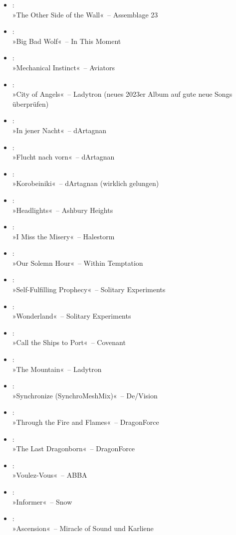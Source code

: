 \begin{itemize}
    \item :\\ »The Other Side of the Wall«~– Assemblage 23
    \item :\\ »Big Bad Wolf«~– In This Moment
    \item :\\ »Mechanical Instinct«~– Aviators
    \item :\\ »City of Angels«~– Ladytron (neues 2023er Album auf gute neue Songs überprüfen)
    \item :\\ »In jener Nacht«~– dArtagnan
    \item :\\ »Flucht nach vorn«~– dArtagnan
    \item :\\ »Korobeiniki«~– dArtagnan (wirklich gelungen)
    \item :\\ »Headlights«~– Ashbury Heights
    \item :\\ »I Miss the Misery«~– Halestorm
    \item :\\ »Our Solemn Hour«~– Within Temptation
    \item :\\ »Self-Fulfilling Prophecy«~– Solitary Experiments
    \item :\\ »Wonderland«~– Solitary Experiments
    \item :\\ »Call the Ships to Port«~– Covenant
    \item :\\ »The Mountain«~– Ladytron
    \item :\\ »Synchronize (SynchroMeshMix)«~– De/Vision
    \item :\\ »Through the Fire and Flames«~– DragonForce
    \item :\\ »The Last Dragonborn«~– DragonForce
    \item :\\ »Voulez-Vous«~– ABBA
    \item :\\ »Informer«~– Snow
    \item :\\ »Ascension«~– Miracle of Sound und Karliene

\end{itemize}
